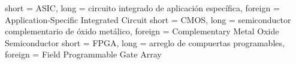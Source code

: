 
  { short = ASIC, long = circuito integrado de aplicación específica, foreign = Application-Specific Integrated Circuit}
  { short = CMOS, long = semiconductor complementario de óxido metálico, foreign = Complementary Metal Oxide Semiconductor}
  { short = FPGA, long = arreglo de compuertas programables, foreign = Field Programmable Gate Array}
